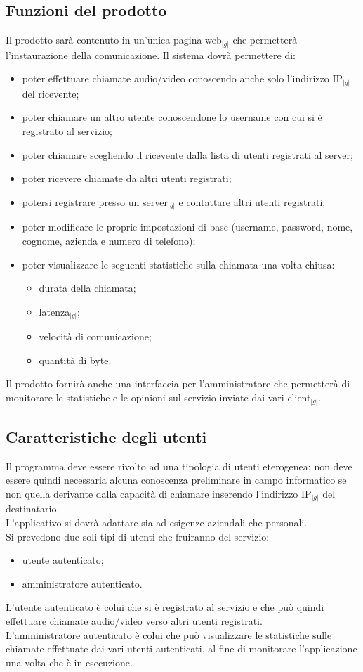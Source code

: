 	\subsection{Funzioni del prodotto}
		Il prodotto sarà contenuto in un'unica pagina web$_{|g|}$ che permetterà l'instaurazione della comunicazione. Il sistema dovrà permettere di:
		\begin{itemize}
			\item poter effettuare chiamate audio/video conoscendo anche solo l'indirizzo IP$_{|g|}$ del ricevente;
			\item poter chiamare un altro utente conoscendone lo username con cui si è registrato al servizio;
			\item poter chiamare scegliendo il ricevente dalla lista di utenti registrati al server;
			\item poter ricevere chiamate da altri utenti registrati;
			\item potersi registrare presso un server$_{|g|}$ e contattare altri utenti registrati;
			\item poter modificare le proprie impostazioni di base (username, password, nome, cognome, azienda e numero di telefono);
			\item poter visualizzare le seguenti statistiche sulla chiamata una volta chiusa:
			\begin{itemize}
				\item durata della chiamata;
				\item latenza$_{|g|}$;
				\item velocità di comunicazione;
				\item quantità di byte.
			\end{itemize}
		\end{itemize}

		Il prodotto fornirà anche una interfaccia per l'amministratore che permetterà di monitorare le statistiche e le opinioni sul servizio inviate dai vari client$_{|g|}$.

	\subsection{Caratteristiche degli utenti}
		Il programma deve essere rivolto ad una tipologia di utenti eterogenea; non deve essere quindi necessaria alcuna conoscenza 
		preliminare in campo informatico se non quella derivante dalla capacità di chiamare 
		inserendo l'indirizzo IP$_{|g|}$ del 
		destinatario.\\
		L'applicativo si dovrà adattare sia ad esigenze aziendali che personali.\\
		Si prevedono due soli tipi di utenti che fruiranno del servizio:
		\begin{itemize}
		\item utente autenticato;
		\item amministratore autenticato.
		\end{itemize}
		L'utente autenticato è colui che si è registrato al servizio e che può quindi effettuare chiamate audio/video verso altri utenti registrati.\\
		L'amministratore autenticato è colui che può visualizzare le statistiche sulle chiamate effettuate dai vari utenti autenticati, al fine di monitorare l'applicazione una volta che è in esecuzione.
		\newpage
